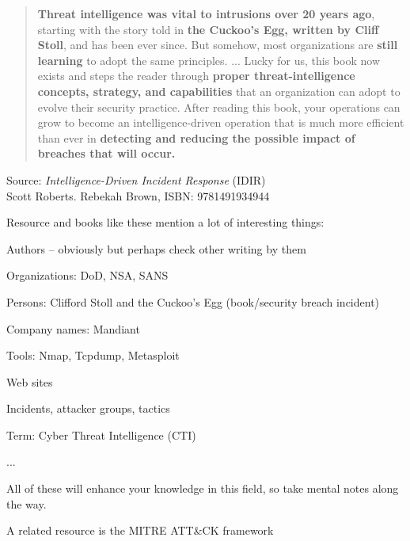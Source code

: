 \documentclass[Screen16to9,17pt]{foils}
\begin{document}


\begin{quote}
{\bf Threat intelligence was vital to intrusions over 20 years ago}, starting with the story told in {\bf the Cuckoo’s Egg, written by Cliff Stoll}, and has been ever since. But somehow, most organizations are {\bf still learning} to adopt the same principles. ... Lucky for us, this book now exists and steps the reader through {\bf proper threat-intelligence concepts, strategy, and capabilities} that an organization can adopt to evolve their security practice. After reading this book, your operations can grow to become an intelligence-driven operation that is much more efficient than ever in {\bf detecting and reducing the possible impact of breaches that will occur.}
\end{quote}
Source: \emph{Intelligence-Driven Incident Response} (IDIR)\\
 Scott Roberts. Rebekah Brown, ISBN: 9781491934944



Resource and books like these mention a lot of interesting things:
\begin{list2}
\item Authors -- obviously but perhaps check other writing by them
\item Organizations: DoD, NSA, SANS 
\item Persons: Clifford Stoll and the Cuckoo's Egg (book/security breach incident)
\item Company names: Mandiant
\item Tools: Nmap, Tcpdump, Metasploit
\item Web sites
\item Incidents, attacker groups, tactics
\item Term: Cyber Threat Intelligence (CTI)
\item ...
\end{list2}

All of these will enhance your knowledge in this field, so take mental notes along the way.

A related resource is the MITRE ATT\&CK framework 


\end{document}
